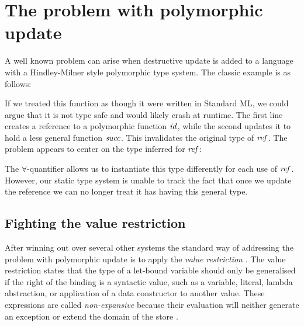 
\clearpage{}
\section{The problem with polymorphic update}

\label{System:PolyUpdate}
A well known problem can arise when destructive update is added to a language with a Hindley-Milner style polymorphic type system. The classic example is as follows:




If we treated this function as though it were written in Standard ML, we could argue that it is not type safe and would likely crash at runtime. The first line creates a reference to a polymorphic function $\operatorname{\mathit{id}}$, while the second updates it to hold a less general function $\operatorname{\mathit{succ}}$. This invalidates the original type of $\operatorname{\mathit{ref}}$. The problem appears to center on the type inferred for $\operatorname{\mathit{ref}}$:


The $\forall$-quantifier allows us to instantiate this type differently for each use of $\operatorname{\mathit{ref}}$. However, our static type system is unable to track the fact that once we update the reference we can no longer treat it has having this general type.

\subsection{Fighting the value restriction}
After winning out over several other systems \cite{garrigue:relaxing} the standard way of addressing the problem with polymorphic update is to apply the \emph{value restriction} \cite{wright:polymorphism-imperative}. The value restriction states that the type of a let-bound variable should only be generalised if the right of the binding is a syntactic value, such as a variable, literal, lambda abstraction, or application of a data constructor to another value. These expressions are called \emph{non-expansive} because their evaluation will neither generate an exception or extend the domain of the store \cite{milner:sml, tofte:polymorphic-references}. 

